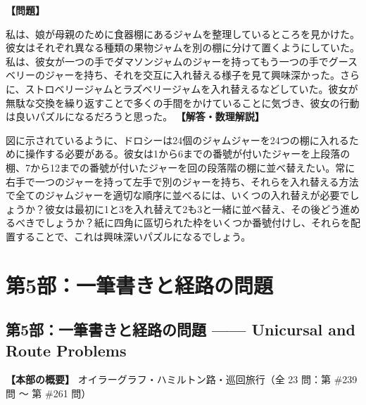 \documentclass[10pt,a4paper,oneside,openany]{ltjsbook}
\begin{document}
\begin{tcolorbox}[colback=softblue,colframe=primaryblue,title=\textbf{第 238 問：ジャムジャーの並べ替え （原題: ARRANGING THE JAMPOTS.）},arc=2mm,boxrule=1pt,breakable]
\textbf{【問題】}\par\vspace{0.3em}
私は、娘が母親のために食器棚にあるジャムを整理しているところを見かけた。彼女はそれぞれ異なる種類の果物ジャムを別の棚に分けて置くようにしていた。私は、彼女が一つの手でダマソンジャムのジャーを持ってもう一つの手でグースベリーのジャーを持ち、それを交互に入れ替える様子を見て興味深かった。さらに、ストロベリージャムとラズベリージャムを入れ替えるなどしていた。彼女が無駄な交換を繰り返すことで多くの手間をかけていることに気づき、彼女の行動は良いパズルになるだろうと思った。
\tcblower
\textbf{【解答・数理解説】}\par\vspace{0.3em}
図に示されているように、ドロシーは24個のジャムジャーを24つの棚に入れるために操作する必要がある。彼女は1から6までの番號が付いたジャーを上段落の棚、7から12までの番號が付いたジャーを回の段落階の棚に並べ替えたい。常に右手で一つのジャーを持って左手で別のジャーを持ち、それらを入れ替える方法で全てのジャムジャーを適切な順序に並べるには、いくつの入れ替えが必要でしょうか？彼女は最初に1と3を入れ替えて2も3と一緒に並べ替え、その後どう進めるべきでしょうか？紙に四角に區切られた枠をいくつか番號付けし、それらを配置することで、これは興味深いパズルになるでしょう。
\end{tcolorbox}

\part{第5部：一筆書きと経路の問題}
\chapter*{第5部：一筆書きと経路の問題 —— Unicursal and Route Problems}

\textbf{【本部の概要】} オイラーグラフ・ハミルトン路・巡回旅行（全 23 問：第 \#239 問 〜 第 \#261 問）

\vspace{1em}
\end{document}
